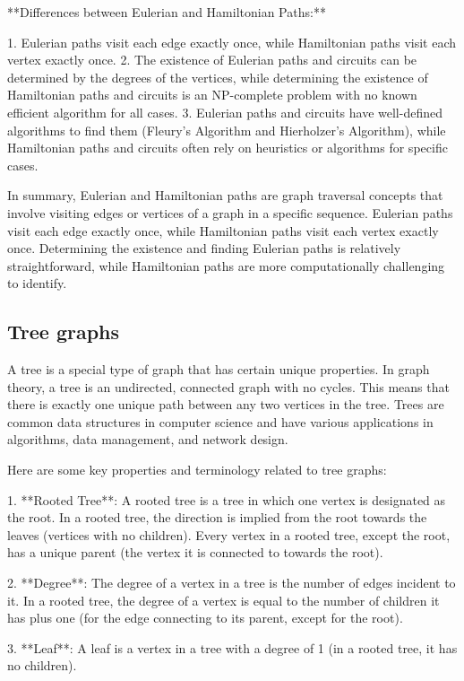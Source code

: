 \documentclass{article}
\begin{document}
**Differences between Eulerian and Hamiltonian Paths:**

1. Eulerian paths visit each edge exactly once, while Hamiltonian paths visit each vertex exactly once.
2. The existence of Eulerian paths and circuits can be determined by the degrees of the vertices, while determining the existence of Hamiltonian paths and circuits is an NP-complete problem with no known efficient algorithm for all cases.
3. Eulerian paths and circuits have well-defined algorithms to find them (Fleury's Algorithm and Hierholzer's Algorithm), while Hamiltonian paths and circuits often rely on heuristics or algorithms for specific cases.

In summary, Eulerian and Hamiltonian paths are graph traversal concepts that involve visiting edges or vertices of a graph in a specific sequence. Eulerian paths visit each edge exactly once, while Hamiltonian paths visit each vertex exactly once. Determining the existence and finding Eulerian paths is relatively straightforward, while Hamiltonian paths are more computationally challenging to identify.


\subsection{Tree graphs}

A tree is a special type of graph that has certain unique properties. In graph theory, a tree is an undirected, connected graph with no cycles. This means that there is exactly one unique path between any two vertices in the tree. Trees are common data structures in computer science and have various applications in algorithms, data management, and network design.

Here are some key properties and terminology related to tree graphs:

1. **Rooted Tree**: A rooted tree is a tree in which one vertex is designated as the root. In a rooted tree, the direction is implied from the root towards the leaves (vertices with no children). Every vertex in a rooted tree, except the root, has a unique parent (the vertex it is connected to towards the root).

2. **Degree**: The degree of a vertex in a tree is the number of edges incident to it. In a rooted tree, the degree of a vertex is equal to the number of children it has plus one (for the edge connecting to its parent, except for the root).

3. **Leaf**: A leaf is a vertex in a tree with a degree of 1 (in a rooted tree, it has no children).
\end{document}
